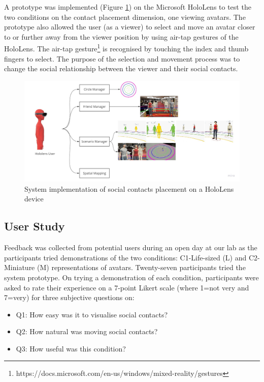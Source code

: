 A prototype was implemented (Figure \ref{fig:placement:system}) on the Microsoft HoloLens to test the two conditions on the contact placement dimension, one viewing avatars. The prototype also allowed the user (as a viewer) to select and move an avatar closer to or further away from the viewer position by using air-tap gestures of the HoloLens. The air-tap gesture\footnote{https://docs.microsoft.com/en-us/windows/mixed-reality/gestures} is recognised by touching the index and thumb fingers to select. The purpose of the selection and movement process was to change the social relationship between the viewer and their social contacts. 

\begin{figure}[h]
    \centering
    \includegraphics[width=\linewidth]{images/ismar17/placement-system.jpg}   
    \caption{System implementation of social contacts placement on a HoloLens device} 
    \label{fig:placement:system}
\end{figure}
\subsection{User Study}

Feedback was collected from potential users during an open day at our lab as the participants tried demonstrations of the two conditions: C1-Life-sized (L) and C2-Miniature (M) representations of avatars. Twenty-seven participants tried the system prototype. On trying a demonstration of each condition, participants were asked to rate their experience on a 7-point Likert scale (where 1=not very and 7=very) for three subjective questions on: 

\begin{itemize}
    \item Q1: How easy was it to visualise social contacts?
    \item Q2: How natural was moving social contacts?
    \item Q3: How useful was this condition?
\end{itemize}

